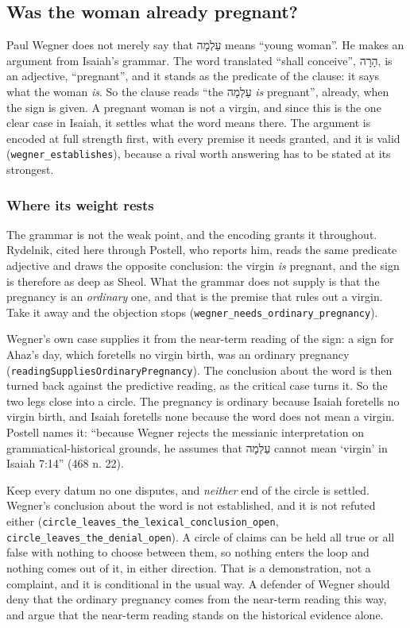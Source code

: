 \documentclass[11pt]{article}
\begin{document}
\subsection*{Was the woman already pregnant?}
Paul Wegner does not merely say that עַלְמָה means “young woman”. He makes an argument from Isaiah’s grammar. The word translated “shall conceive”, הָרָה, is an adjective, “pregnant”, and it stands as the predicate of the clause: it says what the woman \emph{is}. So the clause reads “the עַלְמָה \emph{is} pregnant”, already, when the sign is given. A pregnant woman is not a virgin, and since this is the one clear case in Isaiah, it settles what the word means there. The argument is encoded at full strength first, with every premise it needs granted, and it is valid (\texttt{wegner\_\allowbreak{}establishes}), because a rival worth answering has to be stated at its strongest.

\subsubsection*{Where its weight rests}
The grammar is not the weak point, and the encoding grants it throughout. Rydelnik, cited here through Postell, who reports him, reads the same predicate adjective and draws the opposite conclusion: the virgin \emph{is} pregnant, and the sign is therefore as deep as Sheol. What the grammar does not supply is that the pregnancy is an \emph{ordinary} one, and that is the premise that rules out a virgin. Take it away and the objection stops (\texttt{wegner\_\allowbreak{}needs\_\allowbreak{}ordinary\_\allowbreak{}pregnancy}).

Wegner’s own case supplies it from the near-term reading of the sign: a sign for Ahaz’s day, which foretells no virgin birth, was an ordinary pregnancy (\texttt{reading\allowbreak{}Supplies\allowbreak{}Ordinary\allowbreak{}Pregnancy}). The conclusion about the word is then turned back against the predictive reading, as the critical case turns it. So the two legs close into a circle. The pregnancy is ordinary because Isaiah foretells no virgin birth, and Isaiah foretells none because the word does not mean a virgin. Postell names it: “because Wegner rejects the messianic interpretation on grammatical-historical grounds, he assumes that עַלְמָה cannot mean ‘virgin’ in Isaiah 7:14” (468 n. 22).

Keep every datum no one disputes, and \emph{neither} end of the circle is settled. Wegner’s conclusion about the word is not established, and it is not refuted either (\texttt{circle\_\allowbreak{}leaves\_\allowbreak{}the\_\allowbreak{}lexical\_\allowbreak{}conclusion\_\allowbreak{}open}, \texttt{circle\_\allowbreak{}leaves\_\allowbreak{}the\_\allowbreak{}denial\_\allowbreak{}open}). A circle of claims can be held all true or all false with nothing to choose between them, so nothing enters the loop and nothing comes out of it, in either direction. That is a demonstration, not a complaint, and it is conditional in the usual way. A defender of Wegner should deny that the ordinary pregnancy comes from the near-term reading this way, and argue that the near-term reading stands on the historical evidence alone.
\end{document}

